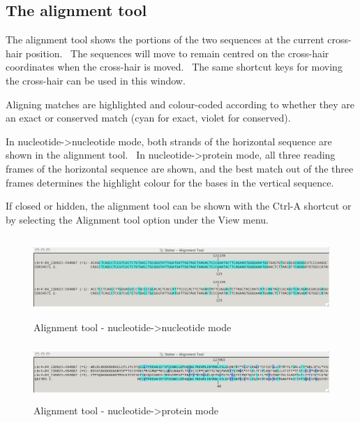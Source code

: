 \documentclass{report}
\begin{document}
{\color[rgb]{0.30980393,0.5058824,0.7411765}\subsection[The alignment tool]{The alignment tool}}
{The alignment tool shows the portions of the two sequences at the
current cross-hair position. \ The sequences will move to remain
centred on the cross-hair coordinates when the cross-hair is moved.
\ The same shortcut keys for moving the cross-hair can be used in this
window.}

\bigskip

{Aligning matches are highlighted and colour-coded according to whether
they are an exact or conserved match (cyan for exact, violet for
conserved).}

\bigskip

{In nucleotide-{\textgreater}nucleotide mode, both strands of the
horizontal sequence are shown in the alignment tool. \ In
nucleotide-{\textgreater}protein mode, all three reading frames of the
horizontal sequence are shown, and the best match out of the three
frames determines the highlight colour for the bases in the vertical
sequence.}

\bigskip

{If closed or hidden, the alignment tool can be shown with the
{\textquotesingle}Ctrl-A{\textquotesingle} shortcut or by selecting the
{\textquotesingle}Alignment tool{\textquotesingle} option under the
{\textquotesingle}View{\textquotesingle} menu.}

\begin{figure}
 \centering
 \color[rgb]{0.30980393,0.5058824,0.7411765}
 \includegraphics[width=15.24cm,height=3.074cm]{img_window_nucleotide.png}
 \caption{Alignment tool - nucleotide-{\textgreater}nucleotide mode}
\end{figure}

\begin{figure}
 \centering
 \color[rgb]{0.30980393,0.5058824,0.7411765}
 \includegraphics[width=15.24cm,height=2.127cm]{img_window_protein.png}
 \caption{Alignment tool - nucleotide-{\textgreater}protein mode}
\end{figure}
\end{document}

